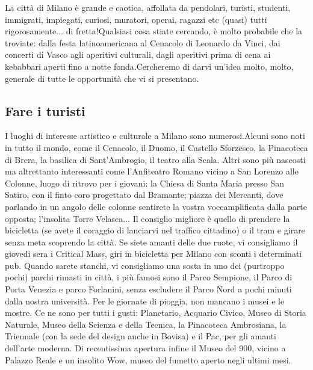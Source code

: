 La città di Milano è grande e caotica, affollata da pendolari, turisti, studenti, immigrati, impiegati, curiosi, muratori, operai, ragazzi etc (quasi) tutti rigorosamente... di fretta!Qualsiasi cosa stiate cercando, è molto probabile che la troviate: dalla festa latinoamericana al Cenacolo di Leonardo da Vinci, dai concerti di Vasco agli aperitivi culturali, dagli aperitivi prima di cena ai kebabbari aperti fino a notte fonda.Cercheremo di darvi un'idea molto, molto, generale di tutte le opportunità che vi si presentano.

\subsection{Fare i turisti}
I luoghi di interesse artistico e culturale a Milano sono numerosi.Alcuni sono noti in tutto il mondo, come il Cenacolo, il Duomo, il Castello Sforzesco, la Pinacoteca di Brera, la basilica di Sant'Ambrogio, il teatro alla Scala. Altri sono più nascosti ma altrettanto interessanti come l'Anfiteatro Romano vicino a San Lorenzo alle Colonne, luogo di ritrovo per i giovani; la Chiesa di Santa Maria presso San Satiro, con il finto coro progettato dal Bramante; piazza dei Mercanti, dove parlando in un angolo delle colonne sentirete la vostra voceamplificata dalla parte opposta; l'insolita Torre Velasca...
Il consiglio migliore è quello di prendere la bicicletta (se avete il coraggio di lanciarvi nel traffico cittadino) o il tram e girare senza meta scoprendo la città. Se siete amanti delle due ruote, vi consigliamo il giovedi sera i Critical Mass, giri in bicicletta per Milano con sconti i determinati pub. Quando sarete stanchi, vi consigliamo una sosta in uno dei (purtroppo pochi) parchi rimasti in città, i più famosi sono il Parco Sempione, il Parco di Porta Venezia e parco Forlanini, senza escludere il Parco Nord a pochi minuti dalla nostra università. Per le giornate di pioggia, non mancano i musei e le mostre. Ce ne sono per tutti i gusti: Planetario, Acquario Civico, Museo di Storia Naturale, Museo della Scienza e della Tecnica, la Pinacoteca Ambrosiana, la Triennale (con la sede del design anche in Bovisa) e il Pac, per gli amanti dell'arte moderna. Di recentissima apertura infine il Museo del 900, vicino a Palazzo Reale e un insolito Wow, museo del fumetto aperto negli ultimi mesi.

